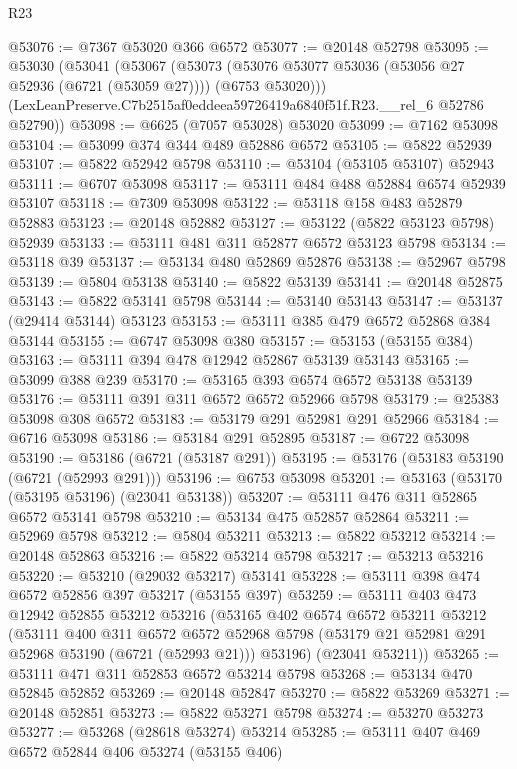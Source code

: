 \begin{lexlean}{R23}
\begin{coremodule}
@53076 := @7367 @53020 @366 @6572
@53077 := @20148 @52798
@53095 := @53030
    (@53041
      (@53067
        (@53073 (@53076 @53077 @53036 (@53056 @27 @52936 (@6721 (@53059 @27)))) (@6753 @53020)))
      (LexLeanPreserve.C7b2515af0eddeea59726419a6840f51f.R23.__rel_6 @52786 @52790))
@53098 := @6625 (@7057 @53028) @53020
@53099 := @7162 @53098
@53104 := @53099 @374 @344 @489 @52886 @6572
@53105 := @5822 @52939
@53107 := @5822 @52942 @5798
@53110 := @53104 (@53105 @53107) @52943
@53111 := @6707 @53098
@53117 := @53111 @484 @488 @52884 @6574 @52939 @53107
@53118 := @7309 @53098
@53122 := @53118 @158 @483 @52879 @52883
@53123 := @20148 @52882
@53127 := @53122 (@5822 @53123 @5798) @52939
@53133 := @53111 @481 @311 @52877 @6572 @53123 @5798
@53134 := @53118 @39
@53137 := @53134 @480 @52869 @52876
@53138 := @52967 @5798
@53139 := @5804 @53138
@53140 := @5822 @53139
@53141 := @20148 @52875
@53143 := @5822 @53141 @5798
@53144 := @53140 @53143
@53147 := @53137 (@29414 @53144) @53123
@53153 := @53111 @385 @479 @6572 @52868 @384 @53144
@53155 := @6747 @53098 @380
@53157 := @53153 (@53155 @384)
@53163 := @53111 @394 @478 @12942 @52867 @53139 @53143
@53165 := @53099 @388 @239
@53170 := @53165 @393 @6574 @6572 @53138 @53139
@53176 := @53111 @391 @311 @6572 @6572 @52966 @5798
@53179 := @25383 @53098 @308 @6572
@53183 := @53179 @291 @52981 @291 @52966
@53184 := @6716 @53098
@53186 := @53184 @291 @52895
@53187 := @6722 @53098
@53190 := @53186 (@6721 (@53187 @291))
@53195 := @53176 (@53183 @53190 (@6721 (@52993 @291)))
@53196 := @6753 @53098
@53201 := @53163 (@53170 (@53195 @53196) (@23041 @53138))
@53207 := @53111 @476 @311 @52865 @6572 @53141 @5798
@53210 := @53134 @475 @52857 @52864
@53211 := @52969 @5798
@53212 := @5804 @53211
@53213 := @5822 @53212
@53214 := @20148 @52863
@53216 := @5822 @53214 @5798
@53217 := @53213 @53216
@53220 := @53210 (@29032 @53217) @53141
@53228 := @53111 @398 @474 @6572 @52856 @397 @53217 (@53155 @397)
@53259 := @53111
    @403
    @473
    @12942
    @52855
    @53212
    @53216
    (@53165
      @402
      @6574
      @6572
      @53211
      @53212
      (@53111
        @400
        @311
        @6572
        @6572
        @52968
        @5798
        (@53179 @21 @52981 @291 @52968 @53190 (@6721 (@52993 @21)))
        @53196)
      (@23041 @53211))
@53265 := @53111 @471 @311 @52853 @6572 @53214 @5798
@53268 := @53134 @470 @52845 @52852
@53269 := @20148 @52847
@53270 := @5822 @53269
@53271 := @20148 @52851
@53273 := @5822 @53271 @5798
@53274 := @53270 @53273
@53277 := @53268 (@28618 @53274) @53214
@53285 := @53111 @407 @469 @6572 @52844 @406 @53274 (@53155 @406)

\end{coremodule}
\end{lexlean}
